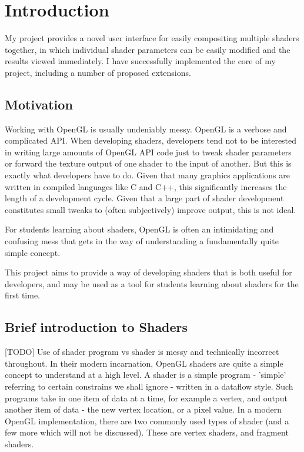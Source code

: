 \documentclass[12pt,twoside,notitlepage]{report}
\begin{document}
\setcounter{page}{1}
\pagestyle{headings}

\chapter{Introduction}
My project provides a novel user interface for easily compositing multiple shaders together, in which individual shader parameters can be easily modified and the results viewed immediately. I have successfully implemented the core of my project, including a number of proposed extensions.

\section{Motivation}
Working with OpenGL is usually undeniably messy. OpenGL is a verbose and complicated API. When developing shaders, developers tend not to be interested in writing large amounts of OpenGL API code just to tweak shader parameters or forward the texture output of one shader to the input of another. But this is exactly what developers have to do. Given that many graphics applications are written in compiled languages like C and C++, this significantly increases the length of a development cycle. Given that a large part of shader development constitutes small tweaks to (often subjectively) improve output, this is not ideal.

For students learning about shaders, OpenGL is often an intimidating and confusing mess that gets in the way of understanding a fundamentally quite simple concept.

This project aims to provide a way of developing shaders that is both useful for developers, and may be used as a tool for students learning about shaders for the first time.
\section{Brief introduction to Shaders}
[TODO] Use of shader program vs shader is messy and technically incorrect throughout.
In their modern incarnation, OpenGL shaders are quite a simple concept to understand at a high level. A shader is a simple program - 'simple' referring to certain constrains we shall ignore - written in a dataflow style. Such programs take in one item of data at a time, for example a vertex, and output another item of data - the new vertex location, or a pixel value.
In a modern OpenGL implementation, there are two commonly used types of shader (and a few more which will not be discussed). These are vertex shaders, and fragment shaders. 
\end{document}

